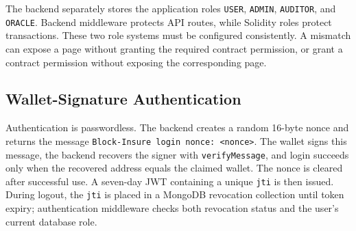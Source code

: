 \begin{table}[htbp]
\centering
\caption{On-chain roles and security boundaries}
\label{tab:onchain_roles}
\end{table}

The backend separately stores the application roles
\texttt{USER}, \texttt{ADMIN}, \texttt{AUDITOR}, and \texttt{ORACLE}. Backend
middleware protects API routes, while Solidity roles protect transactions.
These two role systems must be configured consistently. A mismatch can expose a
page without granting the required contract permission, or grant a contract
permission without exposing the corresponding page.

\subsection{Wallet-Signature Authentication}

Authentication is passwordless. The backend creates a random 16-byte nonce and
returns the message
\texttt{Block-Insure login nonce: <nonce>}. The wallet signs this message, the
backend recovers the signer with \texttt{verifyMessage}, and login succeeds only
when the recovered address equals the claimed wallet. The nonce is cleared after
successful use. A seven-day JWT containing a unique \texttt{jti} is then issued.
During logout, the \texttt{jti} is placed in a MongoDB revocation collection
until token expiry; authentication middleware checks both revocation status and
the user's current database role.

